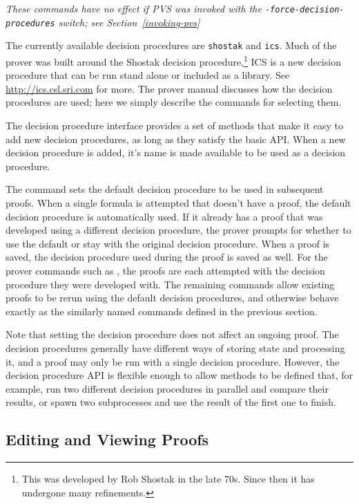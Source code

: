 \emph{These commands have no effect if PVS was invoked with the
\texttt{\textrm{-force-decision-procedures}} switch; see
Section~\ref{invoking-pvs}}

The currently available decision procedures are \texttt{shostak} and
\texttt{ics}.  Much of the prover was built around the Shostak decision
procedure,\footnote{This was developed by Rob Shostak in the late 70s.
Since then it has undergone many refinements.}  ICS is a new decision
procedure that can be run stand alone or included as a library.  See
\url{http://ics.csl.sri.com} for more.  The prover manual discusses how
the decision procedures are used; here we simply describe the commands for
selecting them.

The decision procedure interface provides a set of methods that make it
easy to add new decision procedures, as long as they satisfy the basic
API.  When a new decision procedure is added, it's name is made available
to be used as a decision procedure.

The  command sets the default decision
procedure to be used in subsequent proofs.  When a single formula is
attempted that doesn't have a proof, the default decision procedure is
automatically used.  If it already has a proof that was developed using
a different decision procedure, the prover prompts for whether to use the
default or stay with the original decision procedure.  When a proof is
saved, the decision procedure used during the proof is saved as well.  For
the prover commands such as , the proofs are each
attempted with the decision procedure they were developed with.  The
remaining commands allow existing proofs to be rerun using the default
decision procedures, and otherwise behave exactly as the similarly named
commands defined in the previous section.

Note that setting the decision procedure does not affect an ongoing
proof.  The decision procedures generally have different ways of storing
state and processing it, and a proof may only be run with a single
decision procedure.  However, the decision procedure API is flexible
enough to allow methods to be defined that, for example, run two different
decision procedures in parallel and compare their results, or spawn two
subprocesses and use the result of the first one to finish.

\subsection{Editing and Viewing Proofs}


